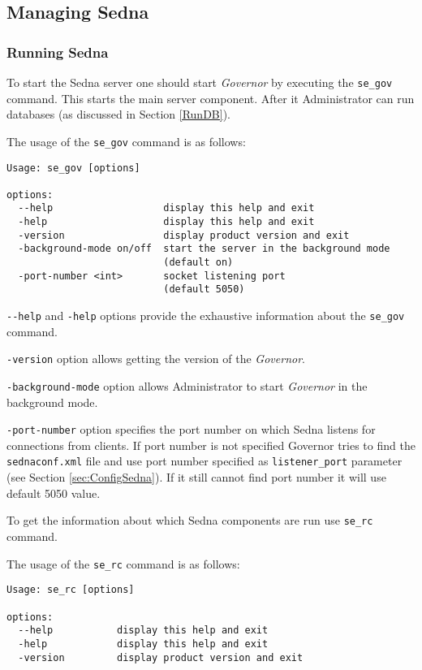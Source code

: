 \documentclass[a4paper,12pt]{article}
\begin{document}
\subsection{Managing Sedna}
\subsubsection{Running Sedna}
\label{StartSedna}

To start the Sedna server one should start \emph{Governor} by executing the \verb!se_gov! command. This starts the main server component. After it Administrator can run databases (as discussed in Section \ref{RunDB}).


The usage of the \verb!se_gov! command is as follows:

\begin{verbatim}
Usage: se_gov [options]

options:
  --help                   display this help and exit
  -help                    display this help and exit
  -version                 display product version and exit
  -background-mode on/off  start the server in the background mode 
                           (default on)
  -port-number <int>       socket listening port
                           (default 5050)
\end{verbatim}

\verb!--help! and \verb!-help! options provide the exhaustive information about the \verb!se_gov! command.

\verb!-version! option allows getting the version of the \emph{Governor}.

\verb!-background-mode! option allows Administrator to start \emph{Governor} in the background mode. 

\verb!-port-number! option specifies the port number on which Sedna listens for connections from clients. If port number is not specified Governor tries to find the \verb!sednaconf.xml! file and use port number specified as \verb!listener_port! parameter (see Section \ref{sec:ConfigSedna}). If it still cannot find port number it will use default 5050 value. 

To get the information about which Sedna components are run use \verb!se_rc! command.

The usage of the \verb!se_rc! command is as follows:

\begin{verbatim}
Usage: se_rc [options]

options:
  --help		   display this help and exit
  -help			   display this help and exit
  -version		   display product version and exit
\end{verbatim}
\end{document}

